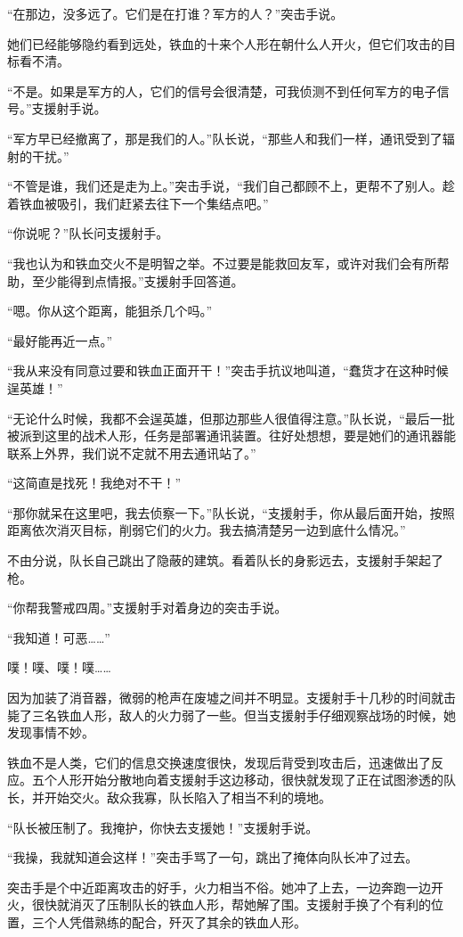 “在那边，没多远了。它们是在打谁？军方的人？”突击手说。

她们已经能够隐约看到远处，铁血的十来个人形在朝什么人开火，但它们攻击的目标看不清。

“不是。如果是军方的人，它们的信号会很清楚，可我侦测不到任何军方的电子信号。”支援射手说。

“军方早已经撤离了，那是我们的人。”队长说，“那些人和我们一样，通讯受到了辐射的干扰。”

“不管是谁，我们还是走为上。”突击手说，“我们自己都顾不上，更帮不了别人。趁着铁血被吸引，我们赶紧去往下一个集结点吧。”

“你说呢？”队长问支援射手。

“我也认为和铁血交火不是明智之举。不过要是能救回友军，或许对我们会有所帮助，至少能得到点情报。”支援射手回答道。

“嗯。你从这个距离，能狙杀几个吗。”

“最好能再近一点。”

“我从来没有同意过要和铁血正面开干！”突击手抗议地叫道，“蠢货才在这种时候逞英雄！”

“无论什么时候，我都不会逞英雄，但那边那些人很值得注意。”队长说，“最后一批被派到这里的战术人形，任务是部署通讯装置。往好处想想，要是她们的通讯器能联系上外界，我们说不定就不用去通讯站了。”

“这简直是找死！我绝对不干！”

“那你就呆在这里吧，我去侦察一下。”队长说，“支援射手，你从最后面开始，按照距离依次消灭目标，削弱它们的火力。我去搞清楚另一边到底什么情况。”

不由分说，队长自己跳出了隐蔽的建筑。看着队长的身影远去，支援射手架起了枪。

“你帮我警戒四周。”支援射手对着身边的突击手说。

“我知道！可恶……”

噗！噗、噗！噗……

因为加装了消音器，微弱的枪声在废墟之间并不明显。支援射手十几秒的时间就击毙了三名铁血人形，敌人的火力弱了一些。但当支援射手仔细观察战场的时候，她发现事情不妙。

铁血不是人类，它们的信息交换速度很快，发现后背受到攻击后，迅速做出了反应。五个人形开始分散地向着支援射手这边移动，很快就发现了正在试图渗透的队长，并开始交火。敌众我寡，队长陷入了相当不利的境地。

“队长被压制了。我掩护，你快去支援她！”支援射手说。

“我操，我就知道会这样！”突击手骂了一句，跳出了掩体向队长冲了过去。

突击手是个中近距离攻击的好手，火力相当不俗。她冲了上去，一边奔跑一边开火，很快就消灭了压制队长的铁血人形，帮她解了围。支援射手换了个有利的位置，三个人凭借熟练的配合，歼灭了其余的铁血人形。

